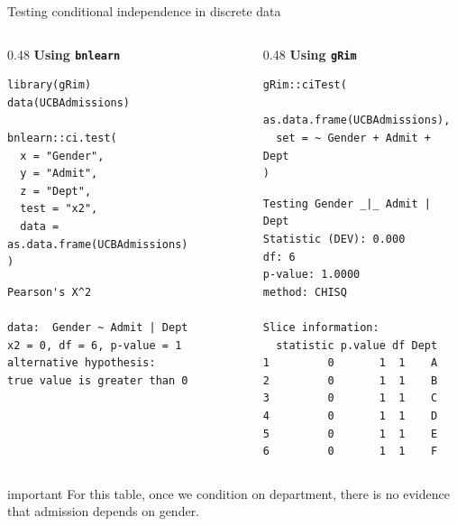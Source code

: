 \documentclass[dvipsnames,aspectratio=169,handout]{beamer}
\begin{document}
\begin{frame}[fragile]{Testing conditional independence in discrete data}

\begin{columns}[T,onlytextwidth]
\begin{column}{0.48\textwidth}
\textbf{Using \texttt{bnlearn}}
\begin{lstlisting}
library(gRim)
data(UCBAdmissions)

bnlearn::ci.test(
  x = "Gender",
  y = "Admit",
  z = "Dept",
  test = "x2",
  data = as.data.frame(UCBAdmissions)
)
\end{lstlisting}

\begin{lstlisting}
Pearson's X^2

data:  Gender ~ Admit | Dept
x2 = 0, df = 6, p-value = 1
alternative hypothesis:
true value is greater than 0
\end{lstlisting}
\end{column}

\begin{column}{0.48\textwidth}
\textbf{Using \texttt{gRim}}
\begin{lstlisting}
gRim::ciTest(
  as.data.frame(UCBAdmissions),
  set = ~ Gender + Admit + Dept
)
\end{lstlisting}

\begin{lstlisting}
Testing Gender _|_ Admit | Dept
Statistic (DEV): 0.000
df: 6
p-value: 1.0000
method: CHISQ

Slice information:
  statistic p.value df Dept
1         0       1  1    A
2         0       1  1    B
3         0       1  1    C
4         0       1  1    D
5         0       1  1    E
6         0       1  1    F
\end{lstlisting}
\end{column}
\end{columns}

\vspace{1mm}
\begin{beamercolorbox}[wd=\textwidth,sep=6pt,center,rounded=true,shadow=true]{important}
For this table, once we condition on department, there is no evidence that admission depends on gender.
\end{beamercolorbox}

\end{frame}
\end{document}
